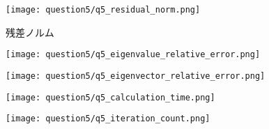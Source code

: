 \documentclass[uplatex,a4j]{jsarticle}
\begin{document}
\begin{figure}[ht]
  \centering
  \texttt{[image: question5/q5\_residual\_norm.png]}
  \caption{残差ノルム}
  \label{fig:q5_rn}
\end{figure}

\begin{figure}[htbp]
  \centering

  \begin{minipage}[t]{0.48\textwidth}
    \centering
    \texttt{[image: question5/q5\_eigenvalue\_relative\_error.png]}
    \label{fig:q5_val_re}
  \end{minipage}
  \hfill
  \begin{minipage}[t]{0.48\textwidth}
    \centering
    \texttt{[image: question5/q5\_eigenvector\_relative\_error.png]}
    \label{fig:q5_vec_re}
  \end{minipage}
  
\end{figure}

\begin{figure}[htbp]
  \centering

  \begin{minipage}[t]{0.48\textwidth}
    \centering
    \texttt{[image: question5/q5\_calculation\_time.png]}
    \label{fig:q5_ct}
  \end{minipage}
  \hfill
  \begin{minipage}[t]{0.48\textwidth}
    \centering
    \texttt{[image: question5/q5\_iteration\_count.png]}
    \label{fig:q5_ic}
  \end{minipage}
  
\end{figure}
\end{document}
